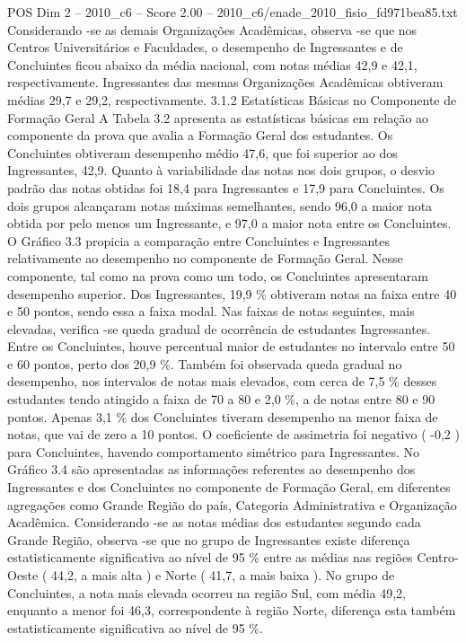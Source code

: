 \begin{textsample}{POS Dim 2 – 2010\_c6 – Score 2.00 – 2010\_c6/enade\_2010\_fisio\_fd971bea85.txt}
Considerando -se as demais Organizações Acadêmicas, observa -se que nos Centros Universitários e Faculdades, o desempenho de Ingressantes e de Concluintes ficou abaixo da média nacional, com notas médias 42,9 e 42,1, respectivamente.
Ingressantes das mesmas Organizações Acadêmicas obtiveram médias 29,7 e 29,2, respectivamente. 3.1.2 Estatísticas Básicas no Componente de Formação Geral A Tabela 3.2 apresenta as estatísticas básicas em relação ao componente da prova que avalia a Formação Geral dos estudantes.
Os Concluintes obtiveram desempenho médio 47,6, que foi superior ao dos Ingressantes, 42,9.
Quanto à variabilidade das notas nos dois grupos, o desvio padrão das notas obtidas foi 18,4 para Ingressantes e 17,9 para Concluintes.
Os dois grupos alcançaram notas máximas semelhantes, sendo 96,0 a maior nota obtida por pelo menos um Ingressante, e 97,0 a maior nota entre os Concluintes.
O Gráfico 3.3 propicia a comparação entre Concluintes e Ingressantes relativamente ao desempenho no componente de Formação Geral.
Nesse componente, tal como na prova como um todo, os Concluintes apresentaram desempenho superior.
Dos Ingressantes, 19,9 \% obtiveram notas na faixa entre 40 e 50 pontos, sendo essa a faixa modal.
Nas faixas de notas seguintes, mais elevadas, verifica -se queda gradual de ocorrência de estudantes Ingressantes.
Entre os Concluintes, houve percentual maior de estudantes no intervalo entre 50 e 60 pontos, perto dos 20,9 \%.
Também foi observada queda gradual no desempenho, nos intervalos de notas mais elevados, com cerca de 7,5 \% desses estudantes tendo atingido a faixa de 70 a 80 e 2,0 \%, a de notas entre 80 e 90 pontos.
Apenas 3,1 \% dos Concluintes tiveram desempenho na menor faixa de notas, que vai de zero a 10 pontos.
O coeficiente de assimetria foi negativo ( -0,2 ) para Concluintes, havendo comportamento simétrico para Ingressantes.
No Gráfico 3.4 são apresentadas as informações referentes ao desempenho dos Ingressantes e dos Concluintes no componente de Formação Geral, em diferentes agregações como Grande Região do país, Categoria Administrativa e Organização Acadêmica.
Considerando -se as notas médias dos estudantes segundo cada Grande Região, observa -se que no grupo de Ingressantes existe diferença estatisticamente significativa ao nível de 95 \% entre as médias nas regiões Centro-Oeste ( 44,2, a mais alta ) e Norte ( 41,7, a mais baixa ).
No grupo de Concluintes, a nota mais elevada ocorreu na região Sul, com média 49,2, enquanto a menor foi 46,3, correspondente à região Norte, diferença esta também estatisticamente significativa ao nível de 95 \%.

\end{textsample}
